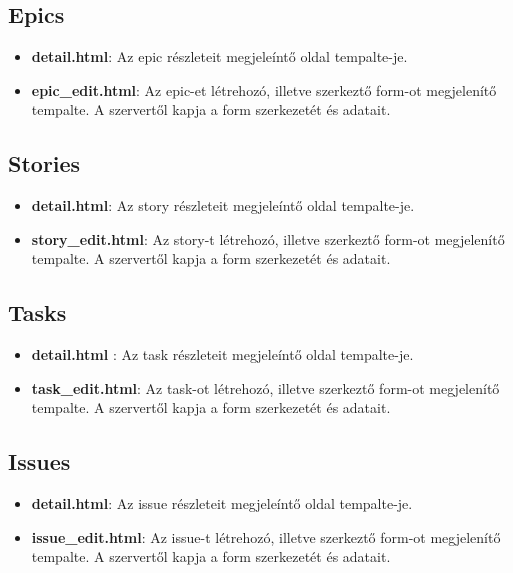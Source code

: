 \subsection{Epics}
\begin{itemize}
	\item \textbf{detail.html}: Az epic részleteit megjeleíntő oldal tempalte-je.
	\item \textbf{epic\_edit.html}: Az epic-et létrehozó, illetve szerkeztő form-ot megjelenítő tempalte. A szervertől kapja a form szerkezetét és adatait.
\end{itemize}
\subsection{Stories}
\begin{itemize}
	\item \textbf{detail.html}: Az story részleteit megjeleíntő oldal tempalte-je.
	\item \textbf{story\_edit.html}: Az story-t létrehozó, illetve szerkeztő form-ot megjelenítő tempalte. A szervertől kapja a form szerkezetét és adatait.
\end{itemize}
\subsection{Tasks}
\begin{itemize}
	\item \textbf{detail.html} : Az task részleteit megjeleíntő oldal tempalte-je.
	\item \textbf{task\_edit.html}: Az task-ot létrehozó, illetve szerkeztő form-ot megjelenítő tempalte. A szervertől kapja a form szerkezetét és adatait.
\end{itemize}
\subsection{Issues}
\begin{itemize}
	\item \textbf{detail.html}: Az issue részleteit megjeleíntő oldal tempalte-je.
	\item \textbf{issue\_edit.html}: Az issue-t létrehozó, illetve szerkeztő form-ot megjelenítő tempalte. A szervertől kapja a form szerkezetét és adatait.
\end{itemize}
